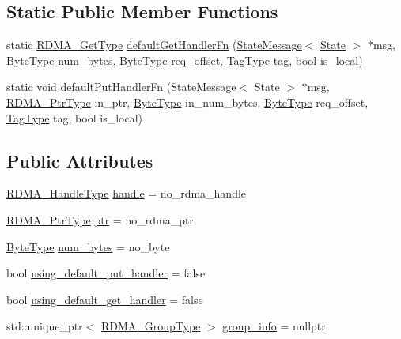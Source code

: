 \subsection*{Static Public Member Functions}
\begin{DoxyCompactItemize}
\item 
static \hyperlink{namespacevt_a1cab7f4860f65a49ad2c042d6240f288}{R\+D\+M\+A\+\_\+\+Get\+Type} \hyperlink{structvt_1_1rdma_1_1_state_a1bf31d5a7099c678a004b12e374ad220}{default\+Get\+Handler\+Fn} (\hyperlink{structvt_1_1rdma_1_1_state_message}{State\+Message}$<$ \hyperlink{structvt_1_1rdma_1_1_state}{State} $>$ $\ast$msg, \hyperlink{namespacevt_aab8d55968084610ce3b17057981e9300}{Byte\+Type} \hyperlink{structvt_1_1rdma_1_1_state_a0c249d4fe06c8ec521ac6f68b064e8a2}{num\+\_\+bytes}, \hyperlink{namespacevt_aab8d55968084610ce3b17057981e9300}{Byte\+Type} req\+\_\+offset, \hyperlink{namespacevt_a84ab281dae04a52a4b243d6bf62d0e52}{Tag\+Type} tag, bool is\+\_\+local)
\item 
static void \hyperlink{structvt_1_1rdma_1_1_state_a529be951a782923d38158859111897cd}{default\+Put\+Handler\+Fn} (\hyperlink{structvt_1_1rdma_1_1_state_message}{State\+Message}$<$ \hyperlink{structvt_1_1rdma_1_1_state}{State} $>$ $\ast$msg, \hyperlink{namespacevt_a9e2c953286c7616f7c218e9951790776}{R\+D\+M\+A\+\_\+\+Ptr\+Type} in\+\_\+ptr, \hyperlink{namespacevt_aab8d55968084610ce3b17057981e9300}{Byte\+Type} in\+\_\+num\+\_\+bytes, \hyperlink{namespacevt_aab8d55968084610ce3b17057981e9300}{Byte\+Type} req\+\_\+offset, \hyperlink{namespacevt_a84ab281dae04a52a4b243d6bf62d0e52}{Tag\+Type} tag, bool is\+\_\+local)
\end{DoxyCompactItemize}
\subsection*{Public Attributes}
\begin{DoxyCompactItemize}
\item 
\hyperlink{namespacevt_a10442579ec4e7ebef223818e64bcf908}{R\+D\+M\+A\+\_\+\+Handle\+Type} \hyperlink{structvt_1_1rdma_1_1_state_ac6ea5c9dffcc795713d1766b1c3e7028}{handle} = no\+\_\+rdma\+\_\+handle
\item 
\hyperlink{namespacevt_a9e2c953286c7616f7c218e9951790776}{R\+D\+M\+A\+\_\+\+Ptr\+Type} \hyperlink{structvt_1_1rdma_1_1_state_a60bb2c1f277de56d89e741f87e944c93}{ptr} = no\+\_\+rdma\+\_\+ptr
\item 
\hyperlink{namespacevt_aab8d55968084610ce3b17057981e9300}{Byte\+Type} \hyperlink{structvt_1_1rdma_1_1_state_a0c249d4fe06c8ec521ac6f68b064e8a2}{num\+\_\+bytes} = no\+\_\+byte
\item 
bool \hyperlink{structvt_1_1rdma_1_1_state_ad3d72847190c02761393d124cb07a917}{using\+\_\+default\+\_\+put\+\_\+handler} = false
\item 
bool \hyperlink{structvt_1_1rdma_1_1_state_ab8fc994adb5e3a106657fff53efd34a8}{using\+\_\+default\+\_\+get\+\_\+handler} = false
\item 
std\+::unique\+\_\+ptr$<$ \hyperlink{structvt_1_1rdma_1_1_state_aec26643b760f80a59e0c07c580e99ebc}{R\+D\+M\+A\+\_\+\+Group\+Type} $>$ \hyperlink{structvt_1_1rdma_1_1_state_ad8dc4c1a674c5a0b14789a53e54815d3}{group\+\_\+info} = nullptr
\end{DoxyCompactItemize}
